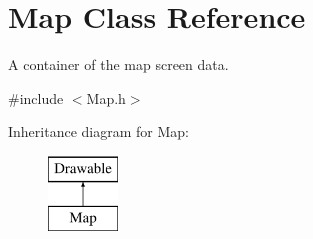 \hypertarget{class_map}{}\section{Map Class Reference}
\label{class_map}


A container of the map screen data.  




{\ttfamily \#include $<$Map.\+h$>$}

Inheritance diagram for Map\+:\begin{figure}[H]
\begin{center}
\leavevmode
\includegraphics[height=2.000000cm]{class_map}
\end{center}
\end{figure}
